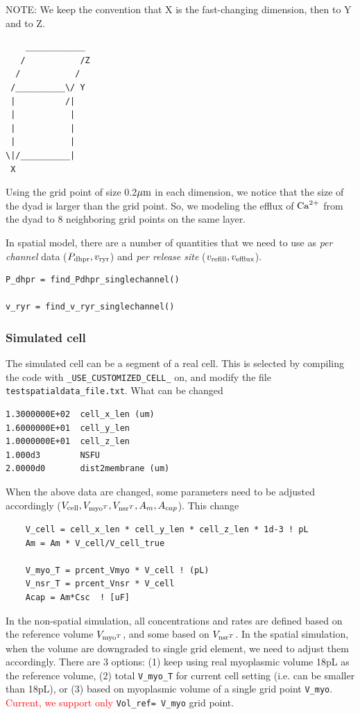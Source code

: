 \begin{framed}
NOTE: We keep the convention that X is the fast-changing dimension,
then to Y and to Z. 
\begin{verbatim}
    ____________
   /           /Z
  /           /
 /__________\/ Y
 |          /|
 |           |
 |           |
 |           |
\|/__________|
 X
\end{verbatim}
\end{framed}

Using the grid point of size 0.2${\mu\text{m}}$ in each dimension, we notice that the
size of the dyad is larger than the grid point. So, we modeling the efflux of
${\text{Ca}^{2+}}$ from the dyad to 8 neighboring grid points on the same layer. 

In spatial model, there are a number of quantities that we need to use as {\it
per channel} data ($P_{\text{dhpr}}, v_{\text{ryr}}$) and {\it per release site} ($v_{\text{refill}},
v_{\text{efflux}}$).
\begin{lstlisting}
P_dhpr = find_Pdhpr_singlechannel()

v_ryr = find_v_ryr_singlechannel()
\end{lstlisting}

\subsubsection{Simulated cell}
\label{sec:cell_simualted}

The simulated cell can be a segment of a real cell. This is selected by
compiling the code with \verb!_USE_CUSTOMIZED_CELL_! on, and modify the file
\verb!testspatialdata_file.txt!. What can be changed
\begin{verbatim}
1.3000000E+02  cell_x_len (um)
1.6000000E+01  cell_y_len
1.0000000E+01  cell_z_len
1.000d3        NSFU 
2.0000d0       dist2membrane (um) 
\end{verbatim}

When the above data are changed, some parameters need to be adjusted
accordingly ($V_{\text{cell}}, V_{\text{myo}^T}, V_{\text{nsr}^T}, A_m, A_{cap}$). This change
\begin{verbatim}    
    V_cell = cell_x_len * cell_y_len * cell_z_len * 1d-3 ! pL
    Am = Am * V_cell/V_cell_true
    
    V_myo_T = prcent_Vmyo * V_cell ! (pL)
    V_nsr_T = prcent_Vnsr * V_cell
    Acap = Am*Csc  ! [uF]
\end{verbatim}

In the non-spatial simulation, all concentrations and rates are defined based on
the reference volume $V_{\text{myo}^T}$, and some based on $V_{\text{nsr}^T}$. In the spatial
simulation, when the volume are downgraded to single grid element, we need to adjust them
accordingly. There are 3 options: (1) keep using real myoplasmic volume
18pL as the reference volume, (2) total \verb!V_myo_T! for current cell setting
(i.e. can be smaller than 18pL), or (3) based on myoplasmic volume of a single
grid point \verb!V_myo!. \textcolor{red}{Current, we support only}
\verb!Vol_ref= V_myo! grid point.


